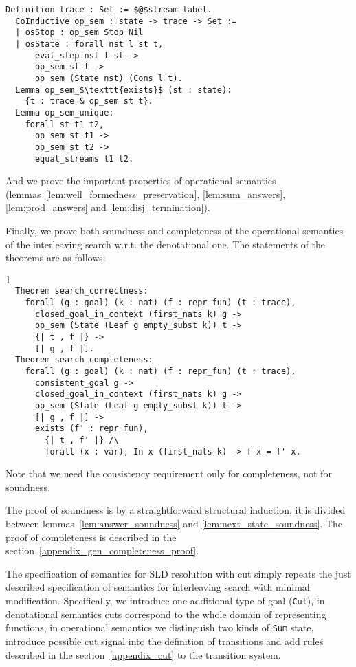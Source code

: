 \begin{lstlisting}[language=Coq]
  Definition trace : Set := $@$stream label.
  CoInductive op_sem : state -> trace -> Set :=
  | osStop : op_sem Stop Nil
  | osState : forall nst l st t,
      eval_step nst l st ->
      op_sem st t ->
      op_sem (State nst) (Cons l t).
  Lemma op_sem_$\texttt{exists}$ (st : state):
    {t : trace & op_sem st t}.
  Lemma op_sem_unique:
    forall st t1 t2,
      op_sem st t1 ->
      op_sem st t2 ->
      equal_streams t1 t2.
\end{lstlisting}

And we prove the important properties of operational semantics (lemmas~\ref{lem:well_formedness_preservation}, \ref{lem:sum_answers}, \ref{lem:prod_answers} and \ref{lem:disj_termination}).

Finally, we prove both soundness and completeness of the operational semantics of the interleaving search w.r.t. the denotational one.
The statements of the theorems are as follows:

\newpage \begin{lstlisting}[language=Coq]]
  Theorem search_correctness:
    forall (g : goal) (k : nat) (f : repr_fun) (t : trace),
      closed_goal_in_context (first_nats k) g ->
      op_sem (State (Leaf g empty_subst k)) t ->
      {| t , f |} ->
      [| g , f |].
  Theorem search_completeness:
    forall (g : goal) (k : nat) (f : repr_fun) (t : trace),
      consistent_goal g ->
      closed_goal_in_context (first_nats k) g ->
      op_sem (State (Leaf g empty_subst k)) t ->
      [| g , f |] ->
      exists (f' : repr_fun),
        {| t , f' |} /\
        forall (x : var), In x (first_nats k) -> f x = f' x.
\end{lstlisting}

Note that we need the consistency requirement only for completeness, not for soundness.

The proof of soundness is by a straightforward structural induction, it is divided between lemmas~\ref{lem:answer_soundness} and \ref{lem:next_state_soundness}. The proof of completeness is described in the section~\ref{appendix_gen_completeness_proof}.

The specification of semantics for SLD resolution with cut simply repeats the just described specification of semantics for interleaving search with minimal modification. Specifically, we introduce one additional type of goal (\lstinline|Cut|), in denotational semantics cuts correspond to the whole domain of representing functions, in operational semantics we distinguish two kinds of \lstinline|Sum| state, introduce possible cut signal into the definition of transitions and add rules described in the section~\ref{appendix_cut} to the transition system. 


